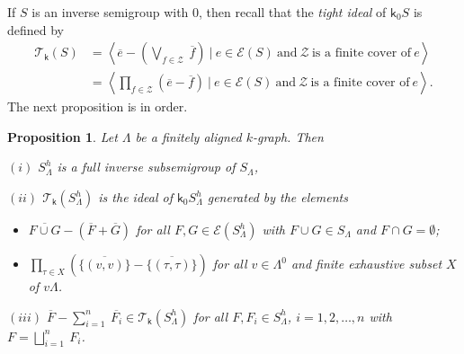 \documentclass[a4paper,reqno,11pt]{amsart}
\numberwithin{equation}{section}
\newtheorem{prop}[thm]{Proposition}
\theoremstyle{definition}
\theoremstyle{remark}
\begin{document}
If $S$ is an inverse semigroup with $0$, then recall that the \emph{tight ideal} of $\mathsf{k}_0S$ \cite{Steinberg} is defined by 
\begin{align*}
\mathcal{T}_\mathsf{k}(S)&=\left\langle \overline{e}-\left(\displaystyle{\bigvee_{f\in \mathcal{Z}}}~\overline{f}\right)~|~e\in \mathcal{E}(S)~\text{and}~\mathcal{Z}~\text{is a finite cover of}~e\right\rangle\\
&=\left\langle \displaystyle{\prod_{f\in \mathcal{Z}}}(\overline{e}-\overline{f})~|~e\in \mathcal{E}(S)~\text{and}~\mathcal{Z}~\text{is a finite cover of}~e\right\rangle.    
\end{align*}
The next proposition is in order.
\begin{prop}\label{pro the tight ideal of the graded core algebra}
Let $\Lambda$ be a finitely aligned $k$-graph. Then

$(i)$ $S_\Lambda^h$ is a full inverse subsemigroup of $S_\Lambda$,

$(ii)$ $\mathcal{T}_\mathsf{k}(S_\Lambda^h)$ is the ideal of $\mathsf{k}_0 S_\Lambda^h$ generated by the elements
\begin{itemize}
    \item[\textup{(I)}] $\overline{F\cup G}-(\overline{F}+\overline{G})$ for all $F,G\in \mathcal{E}(S_\Lambda^h)$ with $F\cup G\in S_\Lambda$ and $F\cap G=\emptyset$;

    \item[\textup{(II)}] $\displaystyle{\prod_{\tau\in X}}\left(\overline{\{(v,v)\}}-\overline{\{(\tau,\tau)\}}\right)$ for all $v\in \Lambda^0$ and finite exhaustive subset $X$ of $v\Lambda$.
\end{itemize}

$(iii)$ $\overline{F}-\displaystyle{\sum_{i=1}^{n}}~\overline{F_i}\in \mathcal{T}_\mathsf{k}(S_\Lambda^h)$ for all $F,F_i\in S_\Lambda^h$, $i=1,2,\ldots,n$ with $F=\displaystyle{\bigsqcup_{i=1}^{n}}~F_i$. 
\end{prop}
\end{document}
